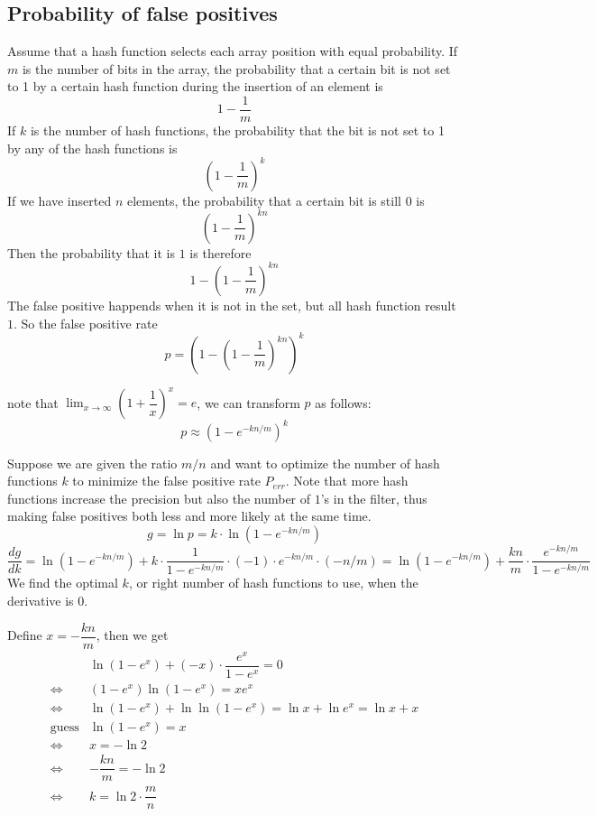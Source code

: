 \subsection{Probability of false positives}
Assume that a hash function selects each array position with equal probability.
If $m$ is the number of bits in the array, the probability that a certain bit is not set to 1 by a certain hash function during the insertion of an element is $$1 - \dfrac{1}{m}$$
If $k$ is the number of hash functions, the probability that the bit is not set to 1 by any of the hash functions is $$(1 - \dfrac{1}{m})^k$$
If we have inserted $n$ elements, the probability that a certain bit is still $0$ is $$(1 - \dfrac{1}{m})^{kn}$$
Then the probability that it is $1$ is therefore $$1 - (1 - \dfrac{1}{m})^{kn}$$
The false positive happends when it is not in the set, but all hash function result $1$. So the false positive rate $$p = (1 - (1 - \dfrac{1}{m})^{kn})^k$$

note that $\lim_{x \to \infty}(1 + \dfrac{1}{x})^x = e$, we can transform $p$ as follows:
$$p \approx (1 - e^{-kn/m})^k$$

Suppose we are given the ratio $m/n$ and want to optimize the number of hash functions $k$ to minimize the false positive rate $P_{err}$.
Note that more hash functions increase the precision but also the number of $1$’s in the filter, thus making false positives both less and more likely at the same time.
$$g = \ln p = k \cdot \ln (1 - e^{-kn/m})$$
$$
\dfrac{dg}{dk}
= \ln (1 - e^{-kn/m}) + k \cdot \dfrac{1}{1 - e^{-kn/m}} \cdot (-1) \cdot e^{-kn/m}\cdot (-n/m)
= \ln (1 - e^{-kn/m}) + \dfrac{kn}{m} \cdot \dfrac{e^{-kn/m}}{1 - e^{-kn/m}}
$$
We find the optimal $k$, or right number of hash functions to use, when the derivative is $0$.

Define $x = - \dfrac{kn}{m}$, then we get
$$
\begin{aligned}
                    & \ln(1 - e^x) + (-x) \cdot \dfrac{e^x}{1 - e^x} = 0 \\
\Longleftrightarrow & (1 - e^x) \ln(1 - e^x) = x e^x \\
\Longleftrightarrow & \ln (1 - e^x) + \ln \ln(1 - e^x) = \ln x + \ln e^x = \ln x + x \\
\text{guess}        & \ln (1 - e^x) = x \\
\Longleftrightarrow & x = -\ln 2 \\
\Longleftrightarrow & - \dfrac{kn}{m} = -\ln 2 \\
\Longleftrightarrow & k = \ln 2 \cdot \dfrac{m}{n} \\
\end{aligned}
$$

